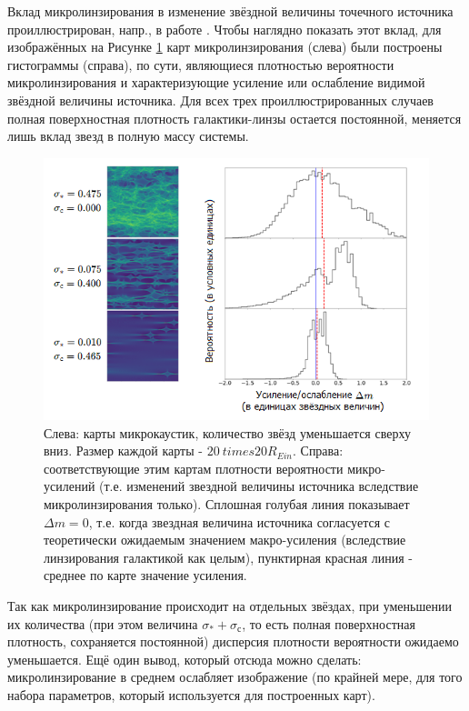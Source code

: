 Вклад микролинзирования в изменение звёздной величины точечного источника проиллюстрирован, напр., в работе \cite{shwamb2002}. Чтобы наглядно показать этот вклад, для изображённых на Рисунке \ref{fig:histograms} карт микролинзирования (слева) были построены гистограммы (справа), по сути, являющиеся плотностью вероятности микролинзирования и характеризующие усиление или ослабление видимой звёздной величины источника. Для всех трех проиллюстрированных случаев полная поверхностная плотность галактики-линзы остается постоянной, меняется лишь вклад звезд в полную массу системы.

\begin{figure}[H]
    \centering
	\includegraphics[scale=0.75]{pics/histograms.png}
	\caption{Слева: карты микрокаустик, количество звёзд уменьшается сверху вниз. Размер каждой карты - $20 \ times 20 R_{Ein}$. Справа: соответствующие этим картам плотности вероятности микро-усилений (т.е. изменений звездной величины источника вследствие микролинзирования только). Сплошная голубая линия показывает $\Delta m=0$, т.е. когда звездная величина источника согласуется с теоретически ожидаемым значением макро-усиления (вследствие линзирования галактикой как целым), пунктирная красная линия - среднее по карте значение усиления. \label{fig:histograms}} 
\end{figure}

Так как микролинзирование происходит на отдельных звёздах, при уменьшении их количества (при этом величина $\sigma_*+\sigma_с$, то есть полная поверхностная плотность, сохраняется постоянной) дисперсия плотности вероятности ожидаемо уменьшается. Ещё один вывод, который отсюда можно сделать: микролинзирование в среднем ослабляет изображение (по крайней мере, для того набора параметров, который используется для построенных карт). 
